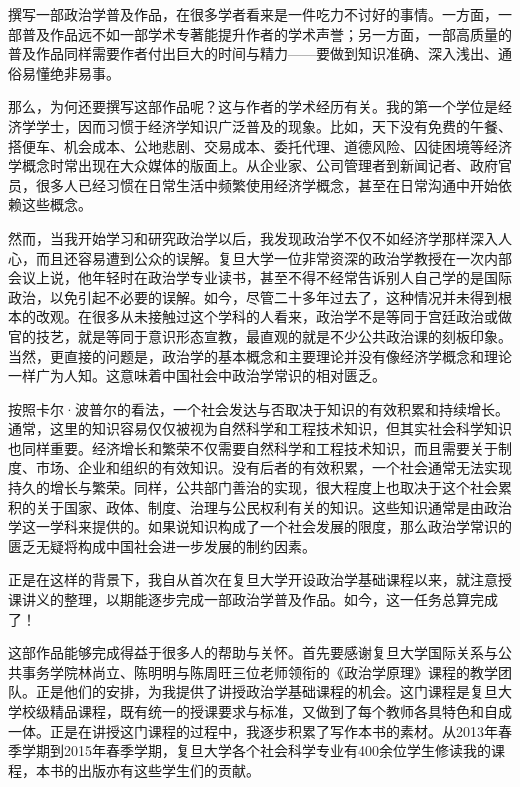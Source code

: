 
撰写一部政治学普及作品，在很多学者看来是一件吃力不讨好的事情。一方面，一部普及作品远不如一部学术专著能提升作者的学术声誉；另一方面，一部高质量的普及作品同样需要作者付出巨大的时间与精力——要做到知识准确、深入浅出、通俗易懂绝非易事。

那么，为何还要撰写这部作品呢？这与作者的学术经历有关。我的第一个学位是经济学学士，因而习惯于经济学知识广泛普及的现象。比如，天下没有免费的午餐、搭便车、机会成本、公地悲剧、交易成本、委托代理、道德风险、囚徒困境等经济学概念时常出现在大众媒体的版面上。从企业家、公司管理者到新闻记者、政府官员，很多人已经习惯在日常生活中频繁使用经济学概念，甚至在日常沟通中开始依赖这些概念。

然而，当我开始学习和研究政治学以后，我发现政治学不仅不如经济学那样深入人心，而且还容易遭到公众的误解。复旦大学一位非常资深的政治学教授在一次内部会议上说，他年轻时在政治学专业读书，甚至不得不经常告诉别人自己学的是国际政治，以免引起不必要的误解。如今，尽管二十多年过去了，这种情况并未得到根本的改观。在很多从未接触过这个学科的人看来，政治学不是等同于宫廷政治或做官的技艺，就是等同于意识形态宣教，最直观的就是不少公共政治课的刻板印象。当然，更直接的问题是，政治学的基本概念和主要理论并没有像经济学概念和理论一样广为人知。这意味着中国社会中政治学常识的相对匮乏。

按照卡尔·波普尔的看法，一个社会发达与否取决于知识的有效积累和持续增长。通常，这里的知识容易仅仅被视为自然科学和工程技术知识，但其实社会科学知识也同样重要。经济增长和繁荣不仅需要自然科学和工程技术知识，而且需要关于制度、市场、企业和组织的有效知识。没有后者的有效积累，一个社会通常无法实现持久的增长与繁荣。同样，公共部门善治的实现，很大程度上也取决于这个社会累积的关于国家、政体、制度、治理与公民权利有关的知识。这些知识通常是由政治学这一学科来提供的。如果说知识构成了一个社会发展的限度，那么政治学常识的匮乏无疑将构成中国社会进一步发展的制约因素。

正是在这样的背景下，我自从首次在复旦大学开设政治学基础课程以来，就注意授课讲义的整理，以期能逐步完成一部政治学普及作品。如今，这一任务总算完成了！

这部作品能够完成得益于很多人的帮助与关怀。首先要感谢复旦大学国际关系与公共事务学院林尚立、陈明明与陈周旺三位老师领衔的《政治学原理》课程的教学团队。正是他们的安排，为我提供了讲授政治学基础课程的机会。这门课程是复旦大学校级精品课程，既有统一的授课要求与标准，又做到了每个教师各具特色和自成一体。正是在讲授这门课程的过程中，我逐步积累了写作本书的素材。从2013年春季学期到2015年春季学期，复旦大学各个社会科学专业有400余位学生修读我的课程，本书的出版亦有这些学生们的贡献。

